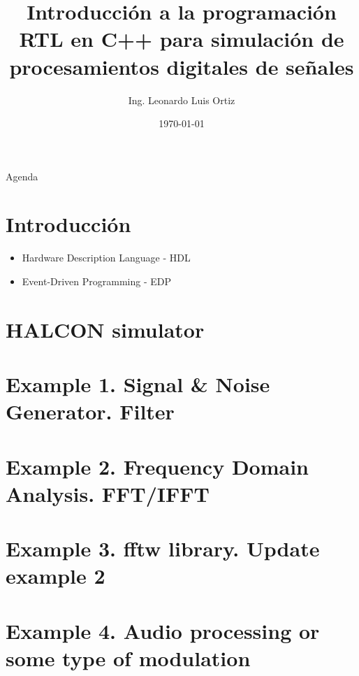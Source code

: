 \documentclass[11pt]{beamer}
\author[LLO]{Ing. Leonardo Luis Ortiz}
\title{Introducción a la programación RTL en C++ para simulación de procesamientos digitales de señales}
\institute[]{Instituto Balseiro \par Centro Atómico Bariloche}
\date{\today}
\begin{document}
	
	\begin{frame}
		\titlepage
	\end{frame}
	
	\begin{frame}{Agenda}
		\tableofcontents 
	\end{frame}
	
	\section{Introducción}
	\begin{frame}
		\begin{itemize}
			\item Hardware Description Language - HDL 
			\item Event-Driven Programming - EDP
		\end{itemize}
	\end{frame}
	
	\section{HALCON simulator}
	\begin{frame}
	\end{frame}
	
	\section{Example 1. Signal \& Noise Generator. Filter}
	\begin{frame}
	\end{frame}
	\section{Example 2. Frequency Domain Analysis. FFT/IFFT}
	\begin{frame}
	\end{frame}
	\section{Example 3. fftw library. Update example 2}
	\begin{frame}
	\end{frame}
	\section{Example 4. Audio processing or some type of modulation}
	\begin{frame}
	\end{frame}
\end{document}

